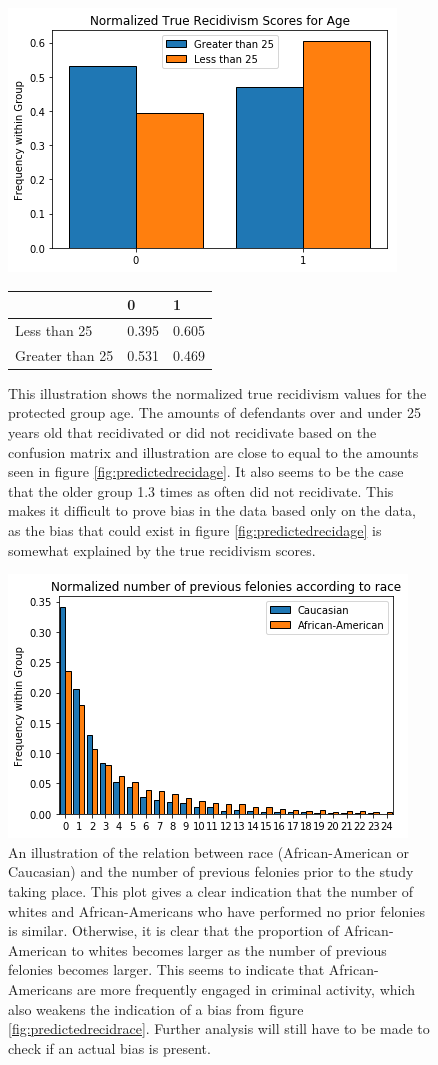 \documentclass[11pt, fleqn, titlepage]{article}
\begin{document}
	\begin{figure}[H]
		\centering
		\includegraphics[width=0.5\linewidth]{imgs/true_normalized_age}
		\begin{table}[H]
			\centering
			\begin{tabular}{|l|l|l|}
				\hline
				& 0   & 1  \\ \hline
				Less than 25      & 0.395 & 0.605  \\ \hline
				Greater than 25   & 0.531 & 0.469  \\ \hline
			\end{tabular}
		\end{table}
		\caption{This illustration shows the normalized true recidivism values for the protected group age. The amounts of defendants over and under 25 years old that recidivated or did not recidivate based on the confusion matrix and illustration are close to equal to the amounts seen in figure \ref{fig:predictedrecidage}. It also seems to be the case that the older group 1.3 times as often did not recidivate. This makes it difficult to prove bias in the data based only on the data, as the bias that could exist in figure \ref{fig:predictedrecidage} is somewhat explained by the true recidivism scores.}
		\label{fig:age_truerecid}
	\end{figure}
	
	
	\begin{figure}[H]
		\centering
		\includegraphics[width=0.5\linewidth]{imgs/proirs}
		\caption{An illustration of the relation between race (African-American or Caucasian) and the number of previous felonies prior to the study taking place. This plot gives a clear indication that the number of whites and African-Americans who have performed no prior felonies is similar. Otherwise, it is clear that the proportion of African-American to whites becomes larger as the number of previous felonies becomes larger. This seems to indicate that African-Americans are more frequently engaged in criminal activity, which also weakens the indication of a bias from figure \ref{fig:predictedrecidrace}. Further analysis will still have to be made to check if an actual bias is present.}
		\label{fig:proirs}
	\end{figure}
\end{document}
